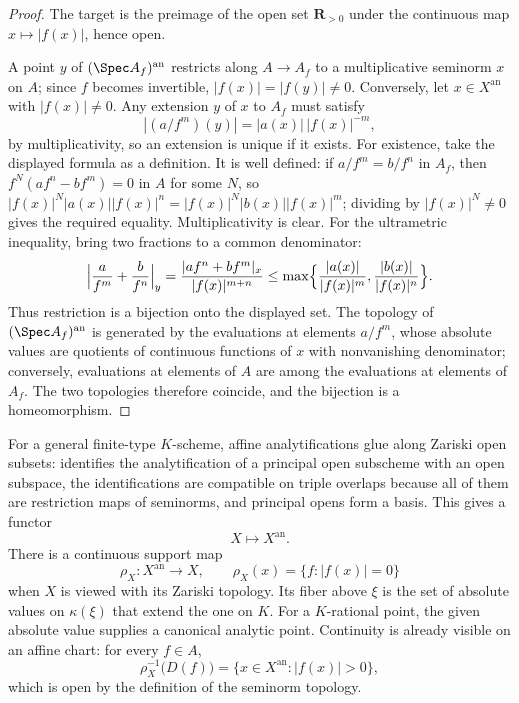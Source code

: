 \begin{proof}
The target is the preimage of the open set
$\mathbf R_{>0}$ under the continuous map $x\mapsto|f(x)|$, hence
open.

A point $y$ of $(\Spec A_f)^{\mathrm{an}}$ restricts along
$A\to A_f$ to a multiplicative seminorm $x$ on $A$; since
$f$ becomes invertible, $|f(x)|=|f(y)|\neq0$.  Conversely, let
$x\in X^{\mathrm{an}}$ with $|f(x)|\neq0$.  Any extension $y$ of
$x$ to $A_f$ must satisfy
\[
 |(a/f^m)(y)|=|a(x)|\,|f(x)|^{-m},
\]
by multiplicativity, so an extension is unique if it exists.  For
existence, take the displayed formula as a definition.  It is well
defined: if $a/f^m=b/f^n$ in $A_f$, then $f^N(af^n-bf^m)=0$ in
$A$ for some $N$, so
$|f(x)|^N|a(x)||f(x)|^n=|f(x)|^N|b(x)||f(x)|^m$; dividing by
$|f(x)|^{N}\neq0$ gives the required equality.  Multiplicativity is
clear.  For the ultrametric inequality, bring two fractions to a common
denominator:
\[
 \Bigl|\frac{a}{f^m}+\frac{b}{f^n}\Bigr|_y
 =\frac{|af^n+bf^m|_x}{|f(x)|^{m+n}}
 \leq\max\Bigl\{\frac{|a(x)|}{|f(x)|^m},
                \frac{|b(x)|}{|f(x)|^n}\Bigr\}.
\]
Thus restriction is a bijection onto the displayed set.  The topology of
$(\Spec A_f)^{\mathrm{an}}$ is generated by the evaluations at elements
$a/f^m$, whose absolute values are quotients of continuous functions of
$x$ with nonvanishing denominator; conversely, evaluations at elements
of $A$ are among the evaluations at elements of $A_f$.  The two
topologies therefore coincide, and the bijection is a homeomorphism.
\end{proof}

For a general finite-type $K$-scheme, affine analytifications glue along
Zariski open subsets:  identifies the
analytification of a principal open subscheme with an open subspace, the
identifications are compatible on triple overlaps because all of them are
restriction maps of seminorms, and principal opens form a basis. This
gives a functor
\[
              X\longmapsto X^{\mathrm{an}}.
\]
There is a continuous support map
\[
 \rho_X:X^{\mathrm{an}}\longrightarrow X,
 \qquad
 \rho_X(x)=\{f:|f(x)|=0\}
\]
when $X$ is viewed with its Zariski topology. Its fiber above $\xi$ is
the set of absolute values on $\kappa(\xi)$ that extend the one on $K$.
For a $K$-rational point, the given absolute value supplies a canonical
analytic point.  Continuity is already visible on an affine chart:
for every $f\in A$,
\[
 \rho_X^{-1}\bigl(D(f)\bigr)
 =\{x\in X^{\mathrm{an}}:|f(x)|>0\},
\]
which is open by the definition of the seminorm topology.

